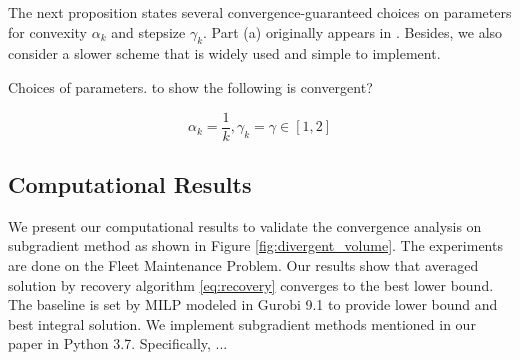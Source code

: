 \documentclass[../main]{subfiles}
\begin{document}


The next proposition states several convergence-guaranteed choices on
parameters for convexity \(\alpha_k\) and stepsize \(\gamma_k\). Part
(a) originally appears in \cite{brannlund1995generalized}. Besides, we
also consider a slower scheme that is widely used and simple to
implement.


\begin{corollary} Choices of parameters. to show the following is convergent?

  \[\alpha_k = \frac{1}{k}, \gamma_k = \gamma \in [1, 2]\]

\end{corollary}


\subsection{Computational Results}\label{computational-results}

We present our computational results to validate the convergence analysis on subgradient method
as shown in Figure \ref{fig:divergent_volume}.
The experiments are done on the Fleet Maintenance Problem.
Our results show that averaged solution by recovery algorithm \eqref{eq:recovery} converges to the best lower bound.
The baseline is set by MILP modeled in Gurobi 9.1 to provide lower bound and best integral solution.
We implement subgradient methods mentioned in our paper in Python 3.7. Specifically, ...
\end{document}
